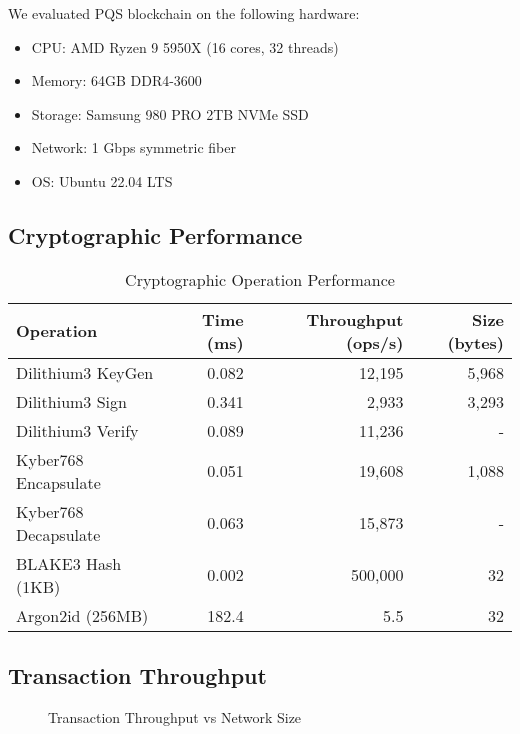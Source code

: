 \documentclass[12pt,a4paper]{article}
\begin{document}
We evaluated PQS blockchain on the following hardware:
\begin{itemize}
\item CPU: AMD Ryzen 9 5950X (16 cores, 32 threads)
\item Memory: 64GB DDR4-3600
\item Storage: Samsung 980 PRO 2TB NVMe SSD
\item Network: 1 Gbps symmetric fiber
\item OS: Ubuntu 22.04 LTS
\end{itemize}

\subsection{Cryptographic Performance}

\begin{table}[h]
\centering
\begin{tabular}{@{}lrrr@{}}
\toprule
\textbf{Operation} & \textbf{Time (ms)} & \textbf{Throughput (ops/s)} & \textbf{Size (bytes)} \\ \midrule
Dilithium3 KeyGen & 0.082 & 12,195 & 5,968 \\
Dilithium3 Sign & 0.341 & 2,933 & 3,293 \\
Dilithium3 Verify & 0.089 & 11,236 & - \\
Kyber768 Encapsulate & 0.051 & 19,608 & 1,088 \\
Kyber768 Decapsulate & 0.063 & 15,873 & - \\
BLAKE3 Hash (1KB) & 0.002 & 500,000 & 32 \\
Argon2id (256MB) & 182.4 & 5.5 & 32 \\
\bottomrule
\end{tabular}
\caption{Cryptographic Operation Performance}
\end{table}

\subsection{Transaction Throughput}

\begin{figure}[h]
\centering
{}
\caption{Transaction Throughput vs Network Size}
\end{figure}
\end{document}
